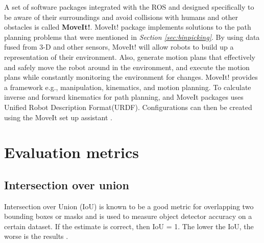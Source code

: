 A set of software packages integrated with the ROS and designed specifically to be aware of their surroundings and avoid collisions with humans and other obstacles is called \textbf{MoveIt!}. MoveIt! package implements solutions to the path planning problems that were mentioned in \textit{Section \ref{sec:binpicking}}. 
By using data fused from 3-D and other sensors, MoveIt! will allow robots to build up a representation of their environment. Also, generate motion plans that effectively and safely move the robot around in the environment, and execute the motion plans while constantly monitoring the environment for changes. 
MoveIt! provides a framework e.g., manipulation, kinematics, and motion planning. To calculate inverse and forward kinematics for path planning, and MoveIt packages uses Unified Robot Description Format(URDF). Configurations can then be created using the MoveIt set up assistant \cite{chitta_moveitros_2012}.

\section{Evaluation metrics}
\subsection{Intersection over union}
Intersection over Union (IoU) is known to be a good metric for overlapping two bounding boxes or masks and is used to measure object detector accuracy on a certain dataset. If the estimate is correct, then IoU = 1. The lower the IoU, the worse is the results \cite{sheremet_intersection_2020}.

